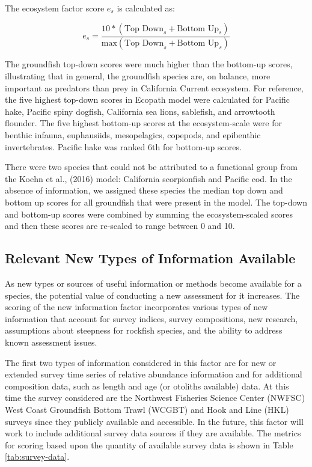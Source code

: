 \documentclass[11pt,
  english,
  a4paper,
]{article}
\begin{document}
The ecosystem factor score \(e_s\) is calculated as:

\[
e_s = \frac{10*(\text{Top Down}_s + \text{Bottom Up}_s)}{\text{max}(\text{Top Down}_s + \text{Bottom Up}_s)}
\]

The groundfish top-down scores were much higher than the bottom-up scores, illustrating that in general, the groundfish species are, on balance, more important as predators than prey in California Current ecosystem. For reference, the five highest top-down scores in Ecopath model were calculated for Pacific hake, Pacific spiny dogfish, California sea lions, sablefish, and arrowtooth flounder. The five highest bottom-up scores at the ecosystem-scale were for benthic infauna, euphausiids, mesopelagics, copepods, and epibenthic invertebrates. Pacific hake was ranked 6th for bottom-up scores.

There were two species that could not be attributed to a functional group from the Koehn et al., (2016) model: California scorpionfish and Pacific cod. In the absence of information, we assigned these species the median top down and bottom up scores for all groundfish that were present in the model. The top-down and bottom-up scores were combined by summing the ecosystem-scaled scores and then these scores are re-scaled to range between 0 and 10.

\hypertarget{relevant-new-types-of-information-available}{%
\subsection{Relevant New Types of Information Available}\label{relevant-new-types-of-information-available}}

As new types or sources of useful information or methods become available for a species, the potential value of conducting a new assessment for it increases. The scoring of the new information factor incorporates various types of new information that account for survey indices, survey compositions, new research, assumptions about steepness for rockfish species, and the ability to address known assessment issues.

The first two types of information considered in this factor are for new or extended survey time series of relative abundance information and for additional composition data, such as length and age (or otoliths available) data. At this time the survey considered are the Northwest Fisheries Science Center (NWFSC) West Coast Groundfish Bottom Trawl (WCGBT) and Hook and Line (HKL) surveys since they publicly available and accessible. In the future, this factor will work to include additional survey data sources if they are available. The metrics for scoring based upon the quantity of available survey data is shown in Table \ref{tab:survey-data}.
\end{document}
